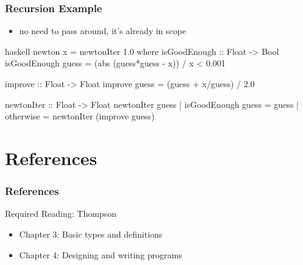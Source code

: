 \documentclass[dvipsnames]{beamer}
\theoremstyle{plain}
\begin{document}
\begin{frame}[fragile]
  \frametitle{Recursion Example}

  \begin{exampleblock}{}
    \begin{itemize}
      \item no need to pass  around, it's already in scope
    \end{itemize}

    \pause
    \smallskip
    \begin{pygments}{haskell}
newton x = newtonIter 1.0
  where
    isGoodEnough :: Float -> Bool
    isGoodEnough guess =
        (abs (guess*guess - x)) / x < 0.001

    improve :: Float -> Float
    improve guess = (guess + x/guess) / 2.0

    newtonIter :: Float -> Float
    newtonIter guess
      | isGoodEnough guess = guess
      | otherwise          = newtonIter (improve guess)
    \end{pygments}
  \end{exampleblock}
\end{frame}

\section*{References}

\begin{frame}
  \frametitle{References}

  \begin{block}{Required Reading: Thompson}
    \begin{itemize}
      \item Chapter 3: \alert{Basic types and definitions}
      \item Chapter 4: \alert{Designing and writing programs}
    \end{itemize}
  \end{block}
\end{frame}
\end{document}
